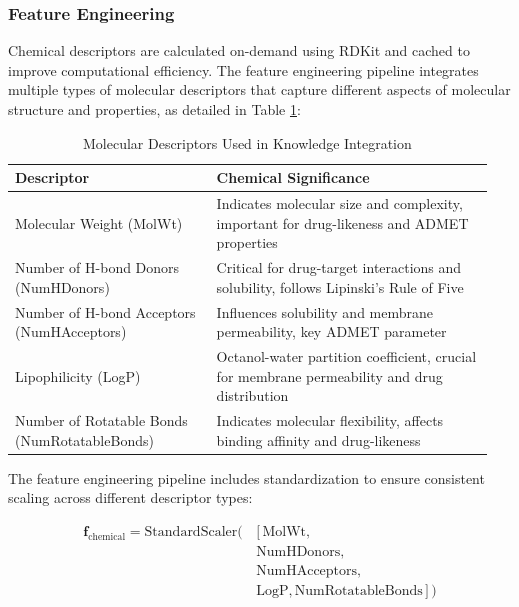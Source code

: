 \documentclass[preprint,12pt]{elsarticle}
\begin{document}
\subsubsection*{Feature Engineering}

Chemical descriptors are calculated on-demand using RDKit and cached to improve computational efficiency. The feature engineering pipeline integrates multiple types of molecular descriptors that capture different aspects of molecular structure and properties, as detailed in Table \ref{tab:rdkit_features}:

\begin{table}[H]
\centering
\caption{Molecular Descriptors Used in Knowledge Integration}
\label{tab:rdkit_features}
\small
\begin{tabular}{p{0.4\linewidth}  p{0.55\linewidth} }
\hline
\textbf{Descriptor} & \textbf{Chemical Significance} \\
\hline
Molecular Weight (MolWt) & Indicates molecular size and complexity, important for drug-likeness and ADMET properties \\
\hline
Number of H-bond Donors (NumHDonors) & Critical for drug-target interactions and solubility, follows Lipinski's Rule of Five \\
\hline
Number of H-bond Acceptors (NumHAcceptors) & Influences solubility and membrane permeability, key ADMET parameter \\
\hline
Lipophilicity (LogP) & Octanol-water partition coefficient, crucial for membrane permeability and drug distribution \\
\hline
Number of Rotatable Bonds (NumRotatableBonds) & Indicates molecular flexibility, affects binding affinity and drug-likeness \\
\hline
\end{tabular}
\end{table}

The feature engineering pipeline includes standardization to ensure consistent scaling across different descriptor types:

\begin{equation}
\begin{split}
\mathbf{f}_{\text{chemical}} = \text{StandardScaler}(\, & [\, \text{MolWt}, \\ & \text{NumHDonors}, \\ & \text{NumHAcceptors}, \\ & \text{LogP}, \text{NumRotatableBonds}\,]\,)
\end{split}
\end{equation}
\end{document}
